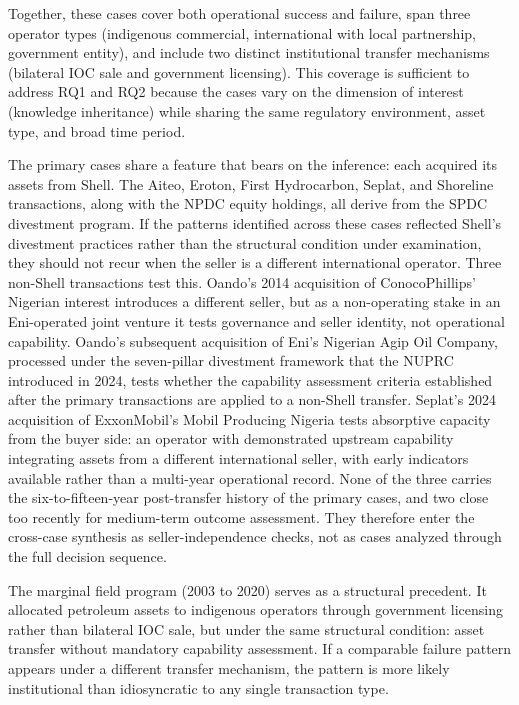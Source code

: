 \documentclass[twoside,fontset=lmodern]{mitthesis}
\begin{document}
Together, these cases cover both operational success and failure, span
three operator types (indigenous commercial, international with local
partnership, government entity), and include two distinct institutional
transfer mechanisms (bilateral IOC sale and government licensing). This
coverage is sufficient to address RQ1 and RQ2 because the cases vary on
the dimension of interest (knowledge inheritance) while sharing the same
regulatory environment, asset type, and broad time period.

The primary cases share a feature that bears on the inference: each
acquired its assets from Shell. The Aiteo, Eroton, First Hydrocarbon,
Seplat, and Shoreline transactions, along with the NPDC equity holdings,
all derive from the SPDC divestment program. If the patterns identified
across these cases reflected Shell's divestment practices rather than
the structural condition under examination, they should not recur when
the seller is a different international operator. Three non-Shell
transactions test this. Oando's 2014 acquisition of ConocoPhillips'
Nigerian interest introduces a different seller, but as a non-operating
stake in an Eni-operated joint venture it tests governance and seller
identity, not operational capability. Oando's subsequent acquisition of
Eni's Nigerian Agip Oil Company, processed under the seven-pillar
divestment framework that the NUPRC introduced in 2024, tests whether
the capability assessment criteria established after the primary
transactions are applied to a non-Shell transfer. Seplat's 2024
acquisition of ExxonMobil's Mobil Producing Nigeria tests absorptive
capacity from the buyer side: an operator with demonstrated upstream
capability integrating assets from a different international seller,
with early indicators available rather than a multi-year operational
record. None of the three carries the six-to-fifteen-year post-transfer
history of the primary cases, and two close too recently for medium-term
outcome assessment. They therefore enter the cross-case synthesis as
seller-independence checks, not as cases analyzed through the full
decision sequence.

The marginal field program (2003 to 2020) serves as a structural
precedent. It allocated petroleum assets to indigenous operators through
government licensing rather than bilateral IOC sale, but under the same
structural condition: asset transfer without mandatory capability
assessment. If a comparable failure pattern appears under a different
transfer mechanism, the pattern is more likely institutional than
idiosyncratic to any single transaction type.
\end{document}
